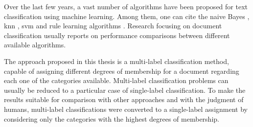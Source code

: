Over the last few years, a vast number of algorithms have been proposed for text classification using machine learning. Among them, one can cite the naive Bayes \cite{mccallum1998comparison}, \gls{knn} \cite{Rijsbergen:1979}, \gls{svm} \cite{joachims1998text} and rule learning algorithms \cite{slattery1998combining}. %
Research focusing on document classification usually reports on performance comparisons between different available algorithms.

The approach proposed in this thesis is a multi-label classification method, capable of assigning different degrees of membership for a document regarding each one of the categories available. Multi-label classification problems can usually be reduced to a particular case of single-label classification. To make the results suitable for comparison with other approaches and with the judgment of humans, multi-label classifications were converted to a single-label assignment by considering only the categories with the highest degrees of membership. 

